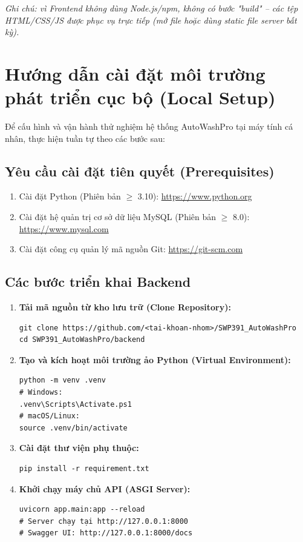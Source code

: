 \textit{Ghi chú: vì Frontend không dùng Node.js/npm, không có bước "build" -- các tệp HTML/CSS/JS được phục vụ trực tiếp (mở file hoặc dùng static file server bất kỳ).}

\section{Hướng dẫn cài đặt môi trường phát triển cục bộ (Local Setup)}
Để cấu hình và vận hành thử nghiệm hệ thống AutoWashPro tại máy tính cá nhân, thực hiện tuần tự theo các bước sau:

\subsection{Yêu cầu cài đặt tiên quyết (Prerequisites)}
\begin{enumerate}
    \item Cài đặt Python (Phiên bản $\geq$ 3.10): \url{https://www.python.org}
    \item Cài đặt hệ quản trị cơ sở dữ liệu MySQL (Phiên bản $\geq$ 8.0): \url{https://www.mysql.com}
    \item Cài đặt công cụ quản lý mã nguồn Git: \url{https://git-scm.com}
\end{enumerate}

\subsection{Các bước triển khai Backend}
\begin{enumerate}
    \item \textbf{Tải mã nguồn từ kho lưu trữ (Clone Repository):}
\begin{verbatim}
git clone https://github.com/<tai-khoan-nhom>/SWP391_AutoWashPro
cd SWP391_AutoWashPro/backend
\end{verbatim}

    \item \textbf{Tạo và kích hoạt môi trường ảo Python (Virtual Environment):}
\begin{verbatim}
python -m venv .venv
# Windows:
.venv\Scripts\Activate.ps1
# macOS/Linux:
source .venv/bin/activate
\end{verbatim}

    \item \textbf{Cài đặt thư viện phụ thuộc:}
\begin{verbatim}
pip install -r requirement.txt
\end{verbatim}

    \item \textbf{Khởi chạy máy chủ API (ASGI Server):}
\begin{verbatim}
uvicorn app.main:app --reload
# Server chạy tại http://127.0.0.1:8000
# Swagger UI: http://127.0.0.1:8000/docs
\end{verbatim}
\end{enumerate}

